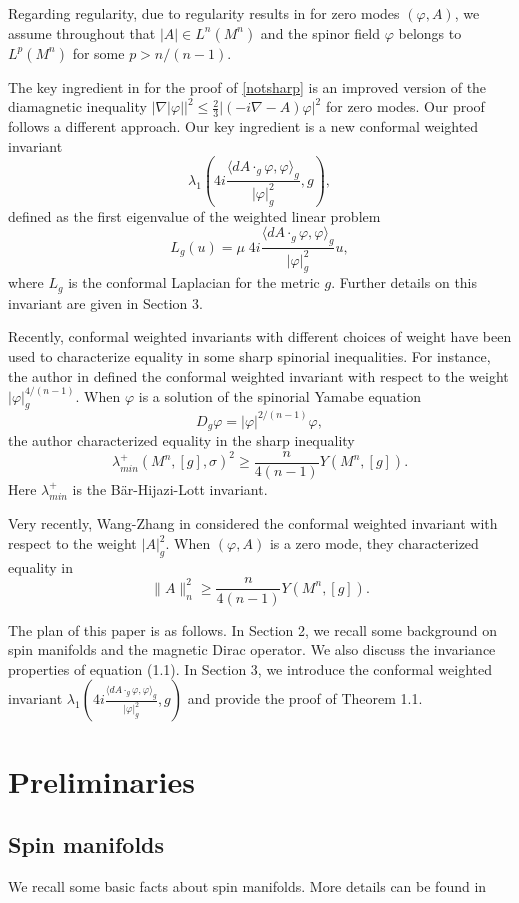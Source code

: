 \documentclass[11pt]{amsart}
\theoremstyle{plain}
\numberwithin{equation}{section}
\theoremstyle{plain}
\begin{document}
Regarding regularity, due to regularity results in \cite{Frank,Frank-Loss2,Wang} for zero modes $(\varphi,A)$, we assume throughout that $|A|\in L^n(M^n)$ and the spinor field $\varphi$ belongs to $L^p(M^n)$ for some $p>n/(n-1)$. 

The key ingredient in \cite{Frank} for the proof of \eqref{notsharp} is an improved version of the diamagnetic inequality $|\nabla|\varphi||^2\leq \frac{2}{3}|(-i\nabla-A)\varphi|^2$ for zero modes. Our proof follows a different approach. Our key ingredient is a new conformal weighted invariant
$$\lambda_1\left(4i\frac{\langle dA\cdot_{g}\varphi,\varphi\rangle_{g}}{|\varphi|_{g}^2},g\right),$$
defined as the first eigenvalue of the weighted linear  problem 
$$L_g(u)=\mu \;4i\frac{\langle dA\cdot_g\varphi,\varphi\rangle_g}{|\varphi|_g^2}u,$$
where $L_g$ is the conformal Laplacian for the metric $g$. Further details on this invariant are given in Section 3.

Recently, conformal weighted invariants with different choices of weight have been used to characterize equality in some sharp spinorial inequalities. For instance, the author in \cite{Julio} defined the conformal weighted invariant with respect to the weight $|\varphi|_g^{4/(n-1)}$. When $\varphi$ is a solution of the spinorial Yamabe equation
$$D_g\varphi=|\varphi|^{2/(n-1)}\varphi,$$
the author characterized equality in the sharp inequality $$\lambda^+_{min}(M^n,[g],\sigma)^2\geq \frac{n}{4(n-1)}Y(M^n,[g]).$$ 
Here $\lambda_{min}^+$ is the Bär-Hijazi-Lott invariant.

Very recently, Wang-Zhang in \cite{Wang} considered the conformal weighted invariant with respect to the weight $|A|_g^2$. When $(\varphi,A)$ is a zero mode, they characterized equality in $$\parallel A\parallel_n^2\geq \frac{n}{4(n-1)}Y(M^n,[g]).$$

The plan of this paper is as follows. In Section 2, we recall some background on spin manifolds and the magnetic Dirac operator. We also discuss the invariance properties of equation (1.1). In Section 3, we introduce the conformal weighted invariant $\lambda_1\left(4i\frac{\langle dA\cdot_{g}\varphi,\varphi\rangle_{g}}{|\varphi|_{g}^2},g\right)$ and provide the proof of Theorem 1.1.


\section{Preliminaries}
\subsection{Spin manifolds}
We recall some basic facts about spin manifolds. More details can be found in \cite{HijaziBook}
\end{document}
